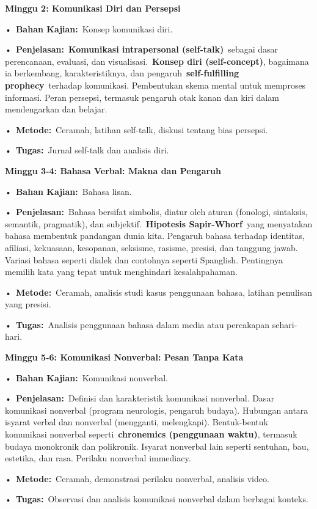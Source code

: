 \documentclass[
  letterpaper,
  DIV=11,
  numbers=noendperiod]{scrreprt}
\begin{document}
\textbf{Minggu 2: Komunikasi Diri dan Persepsi}

•~\textbf{Bahan Kajian:}~Konsep komunikasi diri.

•~\textbf{Penjelasan:}~\textbf{Komunikasi intrapersonal
(self-talk)}~sebagai dasar perencanaan, evaluasi, dan
visualisasi.~\textbf{Konsep diri (self-concept)}, bagaimana ia
berkembang, karakteristiknya, dan pengaruh~\textbf{self-fulfilling
prophecy}~terhadap komunikasi. Pembentukan skema mental untuk memproses
informasi. Peran persepsi, termasuk pengaruh otak kanan dan kiri dalam
mendengarkan dan belajar.

•~\textbf{Metode:}~Ceramah, latihan self-talk, diskusi tentang bias
persepsi.

•~\textbf{Tugas:}~Jurnal self-talk dan analisis diri.

\textbf{Minggu 3-4: Bahasa Verbal: Makna dan Pengaruh}

•~\textbf{Bahan Kajian:}~Bahasa lisan.

•~\textbf{Penjelasan:}~Bahasa bersifat simbolis, diatur oleh aturan
(fonologi, sintaksis, semantik, pragmatik), dan
subjektif.~\textbf{Hipotesis Sapir-Whorf}~yang menyatakan bahasa
membentuk pandangan dunia kita. Pengaruh bahasa terhadap identitas,
afiliasi, kekuasaan, kesopanan, seksisme, rasisme, presisi, dan tanggung
jawab. Variasi bahasa seperti dialek dan contohnya seperti Spanglish.
Pentingnya memilih kata yang tepat untuk menghindari kesalahpahaman.

•~\textbf{Metode:}~Ceramah, analisis studi kasus penggunaan bahasa,
latihan penulisan yang presisi.

•~\textbf{Tugas:}~Analisis penggunaan bahasa dalam media atau percakapan
sehari-hari.

\textbf{Minggu 5-6: Komunikasi Nonverbal: Pesan Tanpa Kata}

•~\textbf{Bahan Kajian:}~Komunikasi nonverbal.

•~\textbf{Penjelasan:}~Definisi dan karakteristik komunikasi nonverbal.
Dasar komunikasi nonverbal (program neurologis, pengaruh budaya).
Hubungan antara isyarat verbal dan nonverbal (mengganti, melengkapi).
Bentuk-bentuk komunikasi nonverbal seperti~\textbf{chronemics
(penggunaan waktu)}, termasuk budaya monokronik dan polikronik. Isyarat
nonverbal lain seperti sentuhan, bau, estetika, dan rasa. Perilaku
nonverbal immediacy.

•~\textbf{Metode:}~Ceramah, demonstrasi perilaku nonverbal, analisis
video.

•~\textbf{Tugas:}~Observasi dan analisis komunikasi nonverbal dalam
berbagai konteks.
\end{document}
